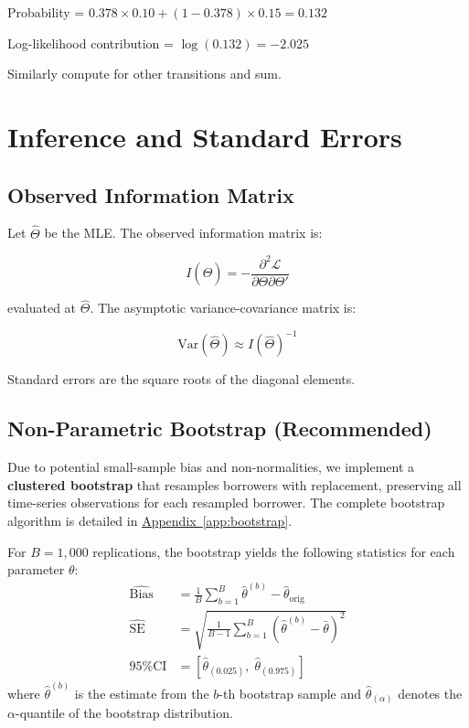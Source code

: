 \documentclass[12pt,a4paper]{article}
\begin{document}
Probability = $0.378 \times 0.10 + (1 - 0.378) \times 0.15 = 0.132$

Log-likelihood contribution = $\log(0.132) = -2.025$

Similarly compute for other transitions and sum.

\section{Inference and Standard Errors}

\subsection{Observed Information Matrix}

Let $\hat{\Theta}$ be the MLE. The observed information matrix is:

\begin{equation}
I(\hat{\Theta}) = -\frac{\partial^2 \mathcal{L}}{\partial \Theta \partial \Theta'}
\end{equation}

evaluated at $\hat{\Theta}$. The asymptotic variance-covariance matrix is:

\begin{equation}
\text{Var}(\hat{\Theta}) \approx I(\hat{\Theta})^{-1}
\end{equation}

Standard errors are the square roots of the diagonal elements.

\subsection{Non-Parametric Bootstrap (Recommended)}

Due to potential small-sample bias and non-normalities, we implement a \textbf{clustered bootstrap} that resamples borrowers with replacement, preserving all time-series observations for each resampled borrower. The complete bootstrap algorithm is detailed in \hyperref[app:bootstrap]{Appendix~\ref*{app:bootstrap}}.

For $B = 1{,}000$ replications, the bootstrap yields the following statistics for each parameter $\theta$:
\begin{align}
\widehat{\text{Bias}} &= \frac{1}{B}\sum_{b=1}^{B} \hat{\theta}^{(b)} - \hat{\theta}_{\text{orig}} \\
\widehat{\text{SE}} &= \sqrt{\frac{1}{B-1}\sum_{b=1}^{B}\left(\hat{\theta}^{(b)} - \bar{\theta}\right)^2} \\
\text{95\% CI} &= \left[\hat{\theta}_{(0.025)},\; \hat{\theta}_{(0.975)}\right]
\end{align}
where $\hat{\theta}^{(b)}$ is the estimate from the $b$-th bootstrap sample and $\hat{\theta}_{(\alpha)}$ denotes the $\alpha$-quantile of the bootstrap distribution.
\end{document}
